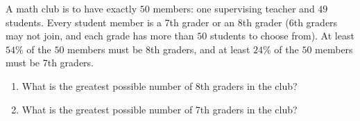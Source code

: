A math club is to have exactly $50$ members: one supervising teacher and $49$ students. Every student member is a 7th grader or an 8th grader (6th graders may not join, and each grade has more than $50$ students to choose from). At least $54\%$ of the $50$ members must be 8th graders, and at least $24\%$ of the $50$ members must be 7th graders.
\begin{enumerate}
\item[(a)] What is the greatest possible number of 8th graders in the club?
\item[(b)] What is the greatest possible number of 7th graders in the club?
\end{enumerate}
